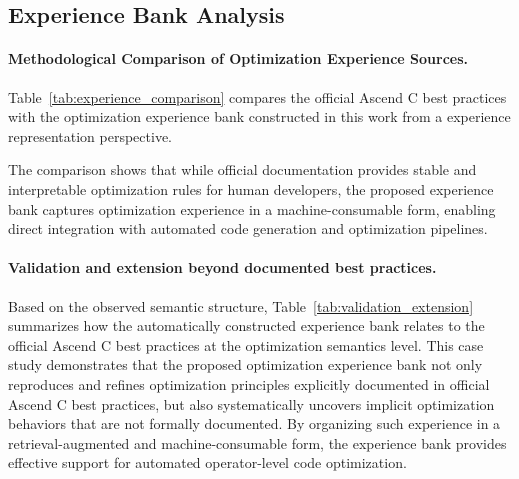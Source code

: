 \documentclass{article}
\theoremstyle{plain}
\theoremstyle{definition}
\theoremstyle{remark}
\begin{document}


\subsection{Experience Bank Analysis}
\paragraph{Methodological Comparison of Optimization Experience Sources.}
Table~\ref{tab:experience_comparison} compares the official Ascend C best practices with the optimization experience bank constructed in this work from a experience representation perspective.



The comparison shows that while official documentation provides stable and interpretable optimization rules for human developers, the proposed experience bank captures optimization experience in a machine-consumable form, enabling direct integration with automated code generation and optimization pipelines.

\paragraph{Validation and extension beyond documented best practices.}
Based on the observed semantic structure, Table~\ref{tab:validation_extension} summarizes how the automatically constructed experience bank relates to the official Ascend C best practices at the optimization semantics level.
This case study demonstrates that the proposed optimization experience bank not only reproduces and refines optimization principles explicitly documented in official Ascend C best practices, but also systematically uncovers implicit optimization behaviors that are not formally documented. By organizing such experience in a retrieval-augmented and machine-consumable form, the experience bank provides effective support for automated operator-level code optimization.
\end{document}
